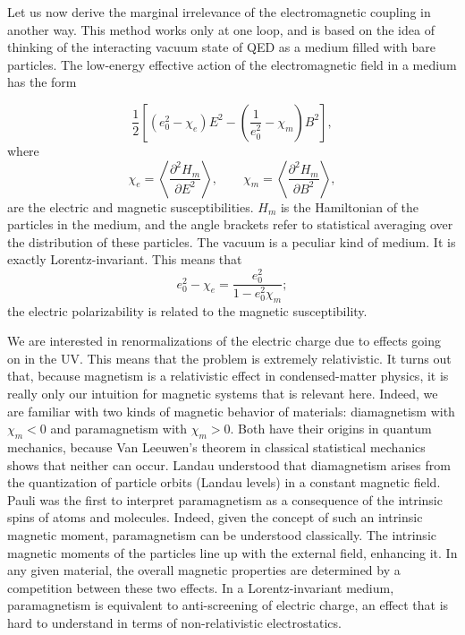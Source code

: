
Let us now derive the marginal irrelevance of the electromagnetic coupling in
another way. This method works only at one loop, and is based on the idea of
thinking of the interacting vacuum state of QED as a medium filled with bare
particles. The low-energy effective action of the electromagnetic field in a
medium has the form

\[
  \frac12\left[(e_0^2-\chi_e)E^2
  -\left(\frac{1}{e_0^2}-\chi_m\right)B^2\right],
\]
where
\[
  \chi_e=\left\langle\frac{\partial^2H_m}{\partial E^2}\right\rangle,
  \qquad
  \chi_m=\left\langle\frac{\partial^2H_m}{\partial B^2}\right\rangle,
\]
are the electric and magnetic susceptibilities. $H_m$ is the Hamiltonian of the
particles in the medium, and the angle brackets refer to statistical averaging
over the distribution of these particles. The vacuum is a peculiar kind of
medium. It is exactly Lorentz-invariant. This means that
\[
  e_0^2-\chi_e=\frac{e_0^2}{1-e_0^2\chi_m};
\]
the electric polarizability is related to the magnetic susceptibility.

We are interested in renormalizations of the electric charge due to effects
going on in the UV. This means that the problem is extremely relativistic. It
turns out that, because magnetism is a relativistic effect in condensed-matter
physics, it is really only our intuition for magnetic systems that is relevant
here. Indeed, we are familiar with two kinds of magnetic behavior of materials:
diamagnetism with $\chi_m<0$ and paramagnetism with $\chi_m>0$. Both have their
origins in quantum mechanics, because Van Leeuwen's theorem in classical
statistical mechanics shows that neither can occur. Landau understood that
diamagnetism arises from the quantization of particle orbits (Landau levels) in
a constant magnetic field. Pauli was the first to interpret paramagnetism as a
consequence of the intrinsic spins of atoms and molecules. Indeed, given the
concept of such an intrinsic magnetic moment, paramagnetism can be understood
classically. The intrinsic magnetic moments of the particles line up with the
external field, enhancing it. In any given material, the overall magnetic
properties are determined by a competition between these two effects. In a
Lorentz-invariant medium, paramagnetism is equivalent to anti-screening of
electric charge, an effect that is hard to understand in terms of
non-relativistic electrostatics.

